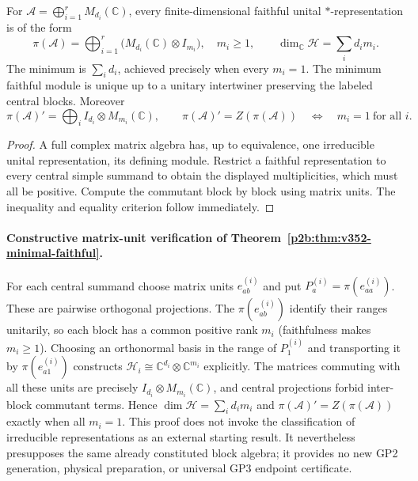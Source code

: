 \documentclass[12pt,a4paper]{article}
\begin{document}
\begin{theorem}
\label{p2b:thm:v352-minimal-faithful}
For $\mathcal A=\bigoplus_{i=1}^{r}M_{d_i}(\mathbb C)$, every
finite-dimensional faithful unital $*$-representation is of the form
\[
 \pi(\mathcal A)=\bigoplus_{i=1}^{r}
     \bigl(M_{d_i}(\mathbb C)\otimes I_{m_i}\bigr),\quad m_i\geq1,
 \qquad \dim_{\mathbb C}\mathcal H=\sum_i d_i m_i.
\]
The minimum is $\sum_i d_i$, achieved precisely when every $m_i=1$.
The minimum faithful module is unique up to a unitary intertwiner
preserving the labeled central blocks.  Moreover
\[
 \pi(\mathcal A)'=\bigoplus_i
  I_{d_i}\otimes M_{m_i}(\mathbb C),\qquad
 \pi(\mathcal A)'=Z(\pi(\mathcal A))
 \quad\Longleftrightarrow\quad m_i=1\ \text{for all }i.
\]
\end{theorem}
\begin{proof}
A full complex matrix algebra has, up to equivalence, one irreducible
unital representation, its defining module.  Restrict a faithful
representation to every central simple summand to obtain the displayed
multiplicities, which must all be positive.  Compute the commutant
block by block using matrix units.  The inequality and equality
criterion follow immediately.
\end{proof}

\paragraph{Constructive matrix-unit verification of Theorem~\ref{p2b:thm:v352-minimal-faithful}.}
For each central summand choose matrix units $e_{ab}^{(i)}$ and put
$P_a^{(i)}=\pi(e_{aa}^{(i)})$.  These are pairwise orthogonal
projections.  The $\pi(e_{ab}^{(i)})$ identify their ranges unitarily,
so each block has a common positive rank $m_i$ (faithfulness makes
$m_i\geq1$).  Choosing an orthonormal basis in the range of
$P_1^{(i)}$ and transporting it by $\pi(e_{a1}^{(i)})$ constructs
$\mathcal H_i\cong\mathbb C^{d_i}\otimes\mathbb C^{m_i}$ explicitly.
The matrices commuting with all these units are precisely
$I_{d_i}\otimes M_{m_i}(\mathbb C)$, and central projections forbid
inter-block commutant terms.  Hence $\dim\mathcal H=\sum_i d_i m_i$
and $\pi(\mathcal A)'=Z(\pi(\mathcal A))$ exactly when all $m_i=1$.
This proof does not invoke the classification of irreducible representations
as an external starting result.  It nevertheless presupposes the same
already constituted block algebra; it provides no new GP2 generation,
physical preparation, or universal GP3 endpoint certificate.
\end{document}
